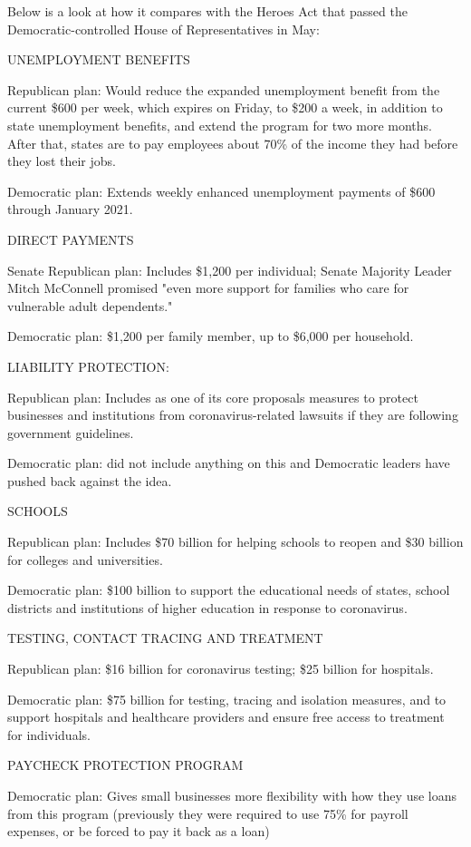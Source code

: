 Below is a look at how it compares with the Heroes Act that passed the
Democratic-controlled House of Representatives in May:

UNEMPLOYMENT BENEFITS

Republican plan: Would reduce the expanded unemployment benefit from the
current \$600 per week, which expires on Friday, to \$200 a week, in
addition to state unemployment benefits, and extend the program for two
more months. After that, states are to pay employees about 70\% of the
income they had before they lost their jobs.

Democratic plan: Extends weekly enhanced unemployment payments of \$600
through January 2021.

DIRECT PAYMENTS

Senate Republican plan: Includes \$1,200 per individual; Senate Majority
Leader Mitch McConnell promised "even more support for families who care
for vulnerable adult dependents."

Democratic plan: \$1,200 per family member, up to \$6,000 per household.

LIABILITY PROTECTION:

Republican plan: Includes as one of its core proposals measures to
protect businesses and institutions from coronavirus-related lawsuits if
they are following government guidelines.

Democratic plan: did not include anything on this and Democratic leaders
have pushed back against the idea.

SCHOOLS

Republican plan: Includes \$70 billion for helping schools to reopen and
\$30 billion for colleges and universities.

Democratic plan: \$100 billion to support the educational needs of
states, school districts and institutions of higher education in
response to coronavirus.

TESTING, CONTACT TRACING AND TREATMENT

Republican plan: \$16 billion for coronavirus testing; \$25 billion for
hospitals.

Democratic plan: \$75 billion for testing, tracing and isolation
measures, and to support hospitals and healthcare providers and ensure
free access to treatment for individuals.

PAYCHECK PROTECTION PROGRAM

Democratic plan: Gives small businesses more flexibility with how they
use loans from this program (previously they were required to use 75\%
for payroll expenses, or be forced to pay it back as a loan)


